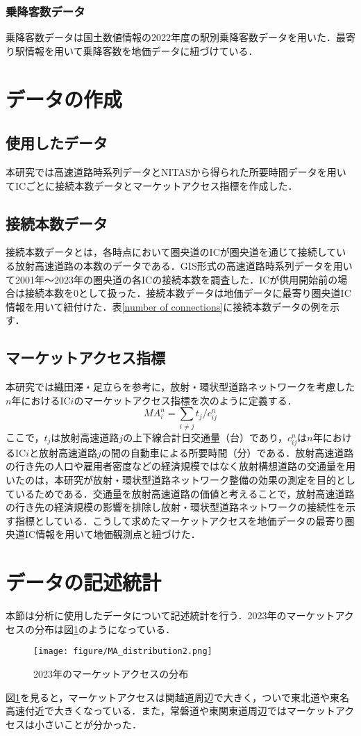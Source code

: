 \subsubsection{乗降客数データ}
乗降客数データは国土数値情報の2022年度の駅別乗降客数データを用いた．最寄り駅情報を用いて乗降客数を地価データに紐づけている．
\newpage
\section{データの作成}
\subsection{使用したデータ}
本研究では高速道路時系列データとNITASから得られた所要時間データを用いてICごとに接続本数データとマーケットアクセス指標を作成した．

\subsection{接続本数データ}
接続本数データとは，各時点において圏央道のICが圏央道を通じて接続している放射高速道路の本数のデータである．GIS形式の高速道路時系列データを用いて2001年〜2023年の圏央道の各ICの接続本数を調査した．ICが供用開始前の場合は接続本数を0として扱った．接続本数データは地価データに最寄り圏央道IC情報を用いて紐付けた．表\ref{number of connections}に接続本数データの例を示す．



\subsection{マーケットアクセス指標}
本研究では織田澤・足立らを参考に，放射・環状型道路ネットワークを考慮した$n$年におけるIC$i$のマーケットアクセス指標を次のように定義する．
\[{MA}^{n}_{i} = \sum_{i \neq j}{t_{j}/c^{n}_{ij}}\]
ここで，$t_{j}$は放射高速道路$j$の上下線合計日交通量（台）であり，$c^{n}_{ij}$は$n$年におけるIC$i$と放射高速道路$j$の間の自動車による所要時間（分）である．放射高速道路の行き先の人口や雇用者密度などの経済規模ではなく放射構想道路の交通量を用いたのは，本研究が放射・環状型道路ネットワーク整備の効果の測定を目的としているためである．交通量を放射高速道路の価値と考えることで，放射高速道路の行き先の経済規模の影響を排除し放射・環状型道路ネットワークの接続性を示す指標としている．こうして求めたマーケットアクセスを地価データの最寄り圏央道IC情報を用いて地価観測点と紐づけた．

\section{データの記述統計}
 本節は分析に使用したデータについて記述統計を行う．2023年のマーケットアクセスの分布は図\ref{MA_2023_distribution}のようになっている．
 \begin{figure}[H]
  \centering
  \texttt{[image: figure/MA\_distribution2.png]}
  \caption{2023年のマーケットアクセスの分布}
  \label{MA_2023_distribution}
\end{figure}
図\ref{MA_2023_distribution}を見ると，マーケットアクセスは関越道周辺で大きく，ついで東北道や東名高速付近で大きくなっている．また，常磐道や東関東道周辺ではマーケットアクセスは小さいことが分かった．

